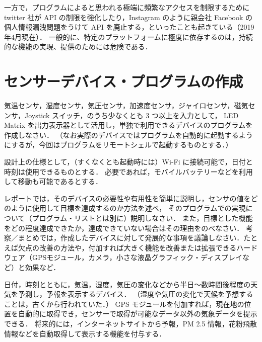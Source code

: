 \documentclass[11pt,a4,epsf]{article}
\begin{document}
一方で，プログラムによると思われる極端に頻繁なアクセスを制限するために twitter 社が API の制限を強化したり，Instagram のように親会社 Facebook の個人情報漏洩問題をうけて API を廃止する，といったことも起きている（2019年4月現在）．
一般的に、特定のプラットフォームに極度に依存するのは，持続的な機能の実現、提供のためには危険である．



\section{センサーデバイス・プログラムの作成}

\begin{subject}
気温センサ，湿度センサ，気圧センサ，加速度センサ，ジャイロセンサ，磁気センサ，Joystick スイッチ，のうち少なくとも 3 つ以上を入力として，
LED Matrix を出力表示器として活用し，単独で利用できるデバイスのプログラムを作成しなさい．
（なお実際のデバイスではプログラムを自動的に起動するようにするが，今回はプログラムをリモートシェルで起動するものとする．）

設計上の仕様として，（すくなくとも起動時には）Wi-Fi に接続可能で，日付と時刻は使用できるものとする．
必要であれば，モバイルバッテリーなどを利用して移動も可能であるとする．

レポートでは，そのデバイスの必要性や有用性を簡単に説明し，センサの値をどのように使用して目標を達成するのか方法を述べ，
そのプログラムでの実現について（プログラム・リストとは別に）説明しなさい．
また，目標とした機能をどの程度達成できたか，達成できていない場合はその理由をのべなさい．
考察／まとめでは，作成したデバイスに対して発展的な事項を議論しなさい．たとえば欠点の改善の方法や，付加すれば大きく機能を改善または拡張できるハードウェア（GPSモジュール，カメラ，小さな液晶グラフィック・ディスプレイなど）と効果など．
\end{subject}

\begin{example}
日付，時刻とともに，気温，湿度，気圧の変化などから半日〜数時間後程度の天気を予測し，予報を表示するデバイス．
（湿度や気圧の変化で天候を予想することは，古くから行われていた．）
GPS モジュールを付加すれば，現在地の位置を自動的に取得でき，センサーで取得が可能なデータ以外の気象データを提示できる．
将来的には，インターネットサイトから予報，PM 2.5 情報，花粉飛散情報などを自動取得して表示する機能を付与する．
\end{example}
\end{document}
